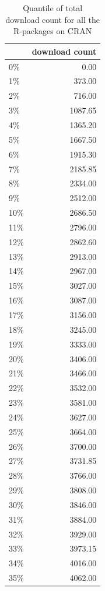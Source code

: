 \documentclass[
]{book}
\begin{document}
\begin{table}

\caption{\label{tab:quantileall}Quantile of total download count for all the R-packages on CRAN}
\centering
\begin{tabular}[t]{l|r}
\hline
  & download count\\
\hline
0\% & 0.00\\
\hline
1\% & 373.00\\
\hline
2\% & 716.00\\
\hline
3\% & 1087.65\\
\hline
4\% & 1365.20\\
\hline
5\% & 1667.50\\
\hline
6\% & 1915.30\\
\hline
7\% & 2185.85\\
\hline
8\% & 2334.00\\
\hline
9\% & 2512.00\\
\hline
10\% & 2686.50\\
\hline
11\% & 2796.00\\
\hline
12\% & 2862.60\\
\hline
13\% & 2913.00\\
\hline
14\% & 2967.00\\
\hline
15\% & 3027.00\\
\hline
16\% & 3087.00\\
\hline
17\% & 3156.00\\
\hline
18\% & 3245.00\\
\hline
19\% & 3333.00\\
\hline
20\% & 3406.00\\
\hline
21\% & 3466.00\\
\hline
22\% & 3532.00\\
\hline
23\% & 3581.00\\
\hline
24\% & 3627.00\\
\hline
25\% & 3664.00\\
\hline
26\% & 3700.00\\
\hline
27\% & 3731.85\\
\hline
28\% & 3766.00\\
\hline
29\% & 3808.00\\
\hline
30\% & 3846.00\\
\hline
31\% & 3884.00\\
\hline
32\% & 3929.00\\
\hline
33\% & 3973.15\\
\hline
34\% & 4016.00\\
\hline
35\% & 4062.00\\

\end{tabular}
\end{table}
\end{document}
